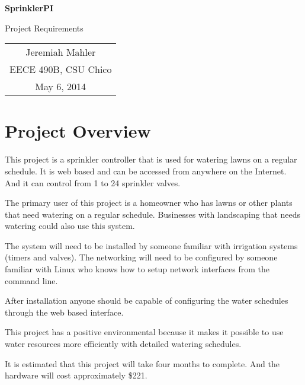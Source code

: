 \documentclass[12pt,letterpaper]{article}
\begin{document}
\vspace*{1.0in}

\centerline{\LARGE \textbf{SprinklerPI}}
\vspace{0.3in}
\centerline{\LARGE Project Requirements}

\vfill

\begin{center}
\begin{tabular}{c}
Jeremiah Mahler \\
EECE 490B, CSU Chico \\
May 6, 2014
\end{tabular}
\end{center}

\vspace{2in}

\thispagestyle{empty}

\pagebreak

\pagebreak
\tableofcontents
{}
\pagebreak

\section{Project Overview}

This project is a sprinkler controller that is used for watering lawns
on a regular schedule.
It is web based and can be accessed from anywhere on the Internet.
And it can control from 1 to 24 sprinkler valves.

The primary user of this project is a homeowner who has
lawns or other plants that need watering on a regular schedule.
Businesses with landscaping that needs watering could also use
this system.

The system will need to be installed by someone familiar with
irrigation systems (timers and valves).
The networking will need to be configured by someone familiar
with Linux who knows how to setup network interfaces from the
command line.

After installation anyone should be capable of configuring the
water schedules through the web based interface.

This project has a positive environmental because it makes it possible
to use water resources more efficiently with detailed watering schedules.

It is estimated that this project will take four months to complete.
And the hardware will cost approximately \$221.
\end{document}
